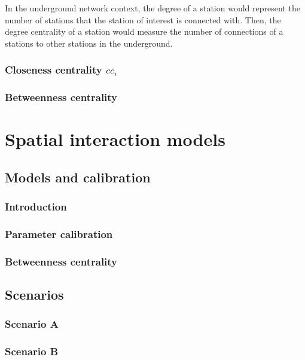 \documentclass{article}
\begin{document}
In the underground network context, the degree of a station would represent the number of  stations that the station of interest is connected with. Then, the degree centrality of a  station would measure the number of connections of a stations to other stations in the underground.

\subsubsection{Closeness centrality $cc_i$}





\subsubsection{Betweenness centrality}


\section{Spatial interaction models}


\subsection{Models and calibration}

\subsubsection{Introduction}

\subsubsection{Parameter calibration}

\subsubsection{Betweenness centrality}

\subsection{Scenarios}

\subsubsection{Scenario A}

\subsubsection{Scenario B}
\end{document}
